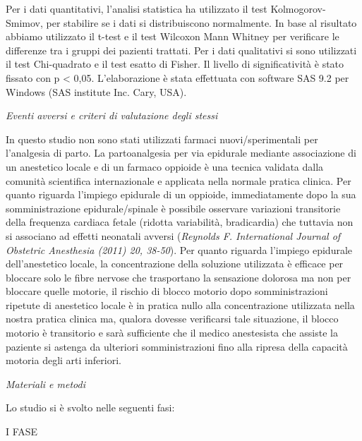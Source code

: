 \documentclass[]{article}
\begin{document}
Per i dati quantitativi, l'analisi statistica ha utilizzato il test
Kolmogorov-Smimov, per stabilire se i dati si distribuiscono
normalmente. In base al risultato abbiamo utilizzato il t-test e il test
Wilcoxon Mann Whitney per verificare le differenze tra i gruppi dei
pazienti trattati. Per i dati qualitativi si sono utilizzati il test
Chi-quadrato e il test esatto di Fisher. Il livello di significatività è
stato fissato con p \textless{} 0,05. L'elaborazione è stata effettuata
con software SAS 9.2 per Windows (SAS institute Inc. Cary, USA).

\emph{Eventi avversi e criteri di valutazione degli stessi}

In questo studio non sono stati utilizzati farmaci nuovi/sperimentali
per l'analgesia di parto. La partoanalgesia per via epidurale mediante
associazione di un anestetico locale e di un farmaco oppioide è una
tecnica validata dalla comunità scientifica internazionale e applicata
nella normale pratica clinica. Per quanto riguarda l'impiego epidurale
di un oppioide, immediatamente dopo la sua somministrazione
epidurale/spinale è possibile osservare variazioni transitorie della
frequenza cardiaca fetale (ridotta variabilità, bradicardia) che
tuttavia non si associano ad effetti neonatali avversi (\emph{Reynolds
F. International Journal of Obstetric Anesthesia (2011) 20, 38-50}). Per
quanto riguarda l'impiego epidurale dell'anestetico locale, la
concentrazione della soluzione utilizzata è efficace per bloccare solo
le fibre nervose che trasportano la sensazione dolorosa ma non per
bloccare quelle motorie, il rischio di blocco motorio dopo
somministrazioni ripetute di anestetico locale è in pratica nullo alla
concentrazione utilizzata nella nostra pratica clinica ma, qualora
dovesse verificarsi tale situazione, il blocco motorio è transitorio e
sarà sufficiente che il medico anestesista che assiste la paziente si
astenga da ulteriori somministrazioni fino alla ripresa della capacità
motoria degli arti inferiori.

\emph{Materiali e metodi}

Lo studio si è svolto nelle seguenti fasi:

{I FASE}
\end{document}
